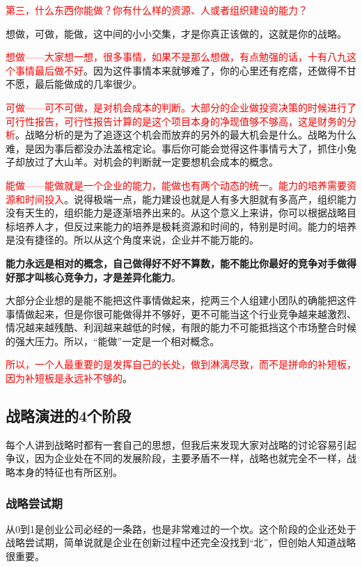 \documentclass[12pt]{article}
\begin{document}
\textcolor{red}{第三，什么东西你能做？你有什么样的资源、人或者组织建设的能力？}

想做，可做，能做，这中间的小小交集，才是你真正该做的，这就是你的战略。

\textcolor{red}{想做——大家想一想，很多事情，如果不是那么想做，有点勉强的话，十有八九这个事情最后做不好}。因为这件事情本来就够难了，你的心里还有疙瘩，还做得不甘不愿，最后能做成的几率很少。

\textcolor{red}{可做——可不可做，是对机会成本的判断。大部分的企业做投资决策的时候进行了可行性报告，可行性报告计算的是这个项目本身的净现值够不够高，这是财务的分析}。战略分析的是为了追逐这个机会而放弃的另外的最大机会是什么。战略为什么难，是因为事后都没办法盖棺定论。事后你可能会觉得这件事情亏大了，抓住小兔子却放过了大山羊。对机会的判断就一定要想机会成本的概念。

\textcolor{red}{能做——能做就是一个企业的能力，能做也有两个动态的统一。能力的培养需要资源和时间投入}。说得极端一点，能力建设也就是人有多大胆就有多高产，组织能力没有天生的，组织能力是逐渐培养出来的。从这个意义上来讲，你可以根据战略目标培养人才，但反过来能力的培养是极耗资源和时间的，特别是时间。能力的培养是没有捷径的。所以从这个角度来说，企业并不能万能的。

\textbf{能力永远是相对的概念，自己做得好不好不算数，能不能比你最好的竞争对手做得好那才叫核心竞争力，才是差异化能力}。

大部分企业想的是能不能把这件事情做起来，挖两三个人组建小团队的确能把这件事情做起来，但是你很可能做得并不够好，更不可能当这个行业竞争越来越激烈、情况越来越残酷、利润越来越低的时候，有限的能力不可能抵挡这个市场整合时候的强大压力。所以，“能做”一定是一个相对概念。

\textcolor{red}{所以，一个人最重要的是发挥自己的长处，做到淋漓尽致，而不是拼命的补短板，因为补短板是永远补不够的}。

\subsection{战略演进的4个阶段}
每个人讲到战略时都有一套自己的思想，但我后来发现大家对战略的讨论容易引起争议，因为企业处在不同的发展阶段，主要矛盾不一样，战略也就完全不一样，战略本身的特征也有所区别。

\subsubsection{战略尝试期}
从0到1是创业公司必经的一条路，也是非常难过的一个坎。这个阶段的企业还处于战略尝试期，简单说就是企业在创新过程中还完全没找到“北”，但创始人知道战略很重要。
\end{document}

